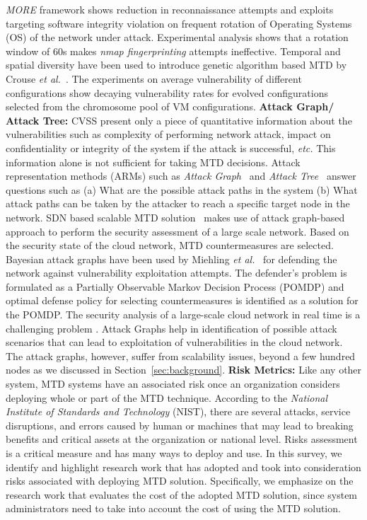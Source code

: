 {\em MORE}  framework shows reduction in reconnaissance attempts and exploits targeting software integrity violation on frequent rotation of Operating Systems (OS) of the network under attack. Experimental analysis shows that a rotation window of $60$s makes \emph{nmap fingerprinting} attempts ineffective. {Temporal} and {spatial} diversity have been used to introduce genetic algorithm based MTD by Crouse \textit{et al.}~. The experiments on {average vulnerability} of different configurations show decaying vulnerability rates for evolved configurations selected from the {chromosome pool} of VM configurations.
\textbf{Attack Graph/ Attack Tree:} CVSS present only a piece of quantitative information about the vulnerabilities such as complexity of performing network attack, impact on confidentiality or integrity of the system if the attack is successful, {\em etc.} This information alone is not sufficient for taking MTD decisions. {Attack representation methods} (ARMs) such as \emph{Attack Graph}~ and \emph{Attack Tree}~ answer questions such as (a) What are the possible {attack paths} in the system (b) What attack paths can be taken by the attacker to reach a specific target node in the network. SDN based scalable MTD solution~ makes use of attack graph-based approach to perform the {security assessment} of a large scale network. Based on the security state of the cloud network, MTD countermeasures are selected. 
{Bayesian attack graphs} have been used by Miehling \textit{et al.}~ for defending the network against vulnerability exploitation attempts. The defender's problem is formulated as a {Partially Observable Markov Decision Process} (POMDP) and {optimal defense} policy for selecting countermeasures is identified as a solution for the {POMDP}. 
The security analysis of a large-scale cloud network in real time is a challenging problem . Attack Graphs help in identification of possible attack scenarios that can lead to exploitation of vulnerabilities in the cloud network. The attack graphs, however, suffer from scalability issues, beyond a few hundred nodes as we discussed in Section~\ref{sec:background}. 
\textbf{Risk Metrics:} 
Like any other system, MTD systems have an associated risk once an organization considers deploying whole or part of the MTD technique. According to the \emph{National Institute of Standards and Technology} (NIST), there are several attacks, service disruptions, and errors caused by human or machines that may lead to breaking benefits and critical assets at the organization or national level. Risks assessment is a critical measure and has many ways to deploy and use. In this survey, we identify and highlight research work that has adopted and took into consideration risks associated with deploying MTD solution. Specifically, we emphasize on the research work that evaluates the {cost} of the adopted MTD solution, since system administrators need to take into account the cost of using the MTD solution. 
